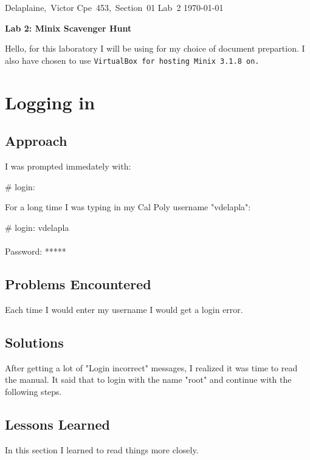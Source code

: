 \documentclass[11pt]{article}
\begin{document}
\hfill\vbox{\hbox{Delaplaine, Victor}
		\hbox{Cpe 453, Section 01}	
		\hbox{Lab 2}	
		\hbox{\today}}\par

\bigskip
\centerline{\Large\bf Lab 2: Minix Scavenger Hunt}\par
\bigskip 

Hello, for this laboratory I will be using \Latex for my choice of document prepartion. 
I also have chosen to use \tt VirtualBox for hosting Minix 3.1.8 on.

\setcounter{section}{1} %
\section{Logging in}


\subsection{Approach}

I was prompted immedately with:

{\tt\begin{tabbing}
\# login: \\
\end{tabbing}}

For a long time I was typing in my Cal Poly username "vdelapla":

{\tt\begin{tabbing}
\# login: vdelapla\\
\\ Password: *****\\
\end{tabbing}}


\subsection{Problems Encountered}
  Each time I would enter my username I would get a login error.

\subsection{Solutions}
  After getting a lot of "Login incorrect" messages, I realized it was time to 
read the manual. It said that to login with the name "root" and continue with 
the following steps.


\subsection{Lessons Learned}
  In this section I learned to read things more closely.
\end{document}
